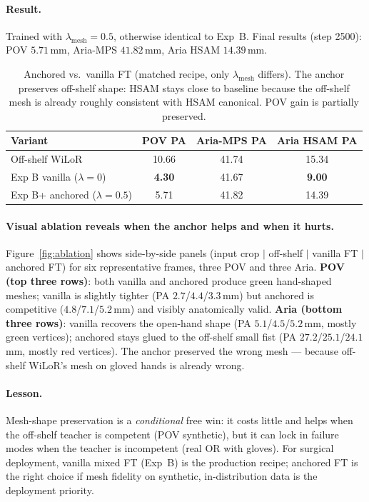 \documentclass{article}
\begin{document}
\paragraph{Result.}
Trained with $\lambda_{\text{mesh}}=0.5$, otherwise identical to Exp~B. Final results (step 2500): POV $5.71$\,mm, Aria-MPS $41.82$\,mm, Aria HSAM $14.39$\,mm.

\begin{table}[h]
\centering
\small
\caption{Anchored vs.\ vanilla FT (matched recipe, only $\lambda_{\text{mesh}}$ differs). The anchor preserves off-shelf shape: HSAM stays close to baseline because the off-shelf mesh is already roughly consistent with HSAM canonical. POV gain is partially preserved.}
\label{tab:anchor}
\begin{tabular}{lccc}
\toprule
\textbf{Variant} & \textbf{POV PA} & \textbf{Aria-MPS PA} & \textbf{Aria HSAM PA} \\
\midrule
Off-shelf WiLoR & 10.66 & 41.74 & 15.34 \\
Exp B vanilla ($\lambda=0$) & \textbf{4.30} & 41.67 & \textbf{9.00} \\
Exp B+ anchored ($\lambda=0.5$) & 5.71 & 41.82 & 14.39 \\
\bottomrule
\end{tabular}
\end{table}

\paragraph{Visual ablation reveals when the anchor helps and when it hurts.}
Figure~\ref{fig:ablation} shows side-by-side panels (input crop $|$ off-shelf $|$ vanilla FT $|$ anchored FT) for six representative frames, three POV and three Aria. \textbf{POV (top three rows)}: both vanilla and anchored produce green hand-shaped meshes; vanilla is slightly tighter (PA $2.7$/$4.4$/$3.3$\,mm) but anchored is competitive ($4.8$/$7.1$/$5.2$\,mm) and visibly anatomically valid. \textbf{Aria (bottom three rows)}: vanilla recovers the open-hand shape (PA $5.1$/$4.5$/$5.2$\,mm, mostly green vertices); anchored stays glued to the off-shelf small fist (PA $27.2$/$25.1$/$24.1$\,mm, mostly red vertices). The anchor preserved the wrong mesh — because off-shelf WiLoR's mesh on gloved hands is already wrong.

\paragraph{Lesson.}
Mesh-shape preservation is a \emph{conditional} free win: it costs little and helps when the off-shelf teacher is competent (POV synthetic), but it can lock in failure modes when the teacher is incompetent (real OR with gloves). For surgical deployment, vanilla mixed FT (Exp~B) is the production recipe; anchored FT is the right choice if mesh fidelity on synthetic, in-distribution data is the deployment priority.
\end{document}
